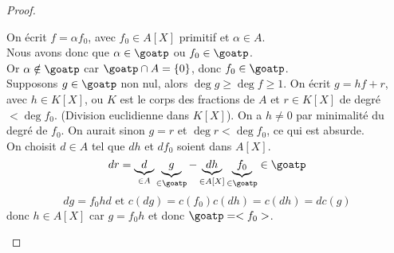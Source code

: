 \begin{proof}
\begin{itemize}
		      On écrit $f = \alpha f_0$, avec $f_0 \in A[X]$ primitif et $\alpha \in A$.\\
		      Nous avons donc que $\alpha \in \goatp$ ou $f_0 \in \goatp$. \\
		      Or $\alpha \notin \goatp$ car $\goatp \cap A = \{0\}$, donc $f_0 \in \goatp$.\\
		      Supposons $g \in \goatp$ non nul, alors $ \deg g \geq \deg f \geq 1$.
		      On écrit $g = hf + r$, avec $h \in K[X]$, ou $K$ est le corps des fractions de $A$ et $r \in K[X]$ de degré $< \deg f_0$.
		      (Division euclidienne dans $K[X]$).
		      On a $h \neq 0$ par minimalité du degré de $f_0$. On aurait sinon
		      $g = r$ et $\deg r < \deg f_0$, ce qui est absurde.\\
		      On choisit $d \in A$ tel que $dh$ et $df_0$ soient dans $A[X]$.\\
		      $$ dr = \underbrace{d}_{\in A} \underbrace{g}_{\in \goatp} - \underbrace{dh}_{\in A[X]} \underbrace{f_0}_{\in \goatp} \in \goatp$$
		      $$ dg =f_0hd \text{ et } c(dg) = c(f_0)c(dh) = c(dh) = dc(g)$$
		      donc $h \in A[X]$ car $g = f_0h$ et donc $\goatp = <f_0>$.
	\end{itemize}
\end{proof}


